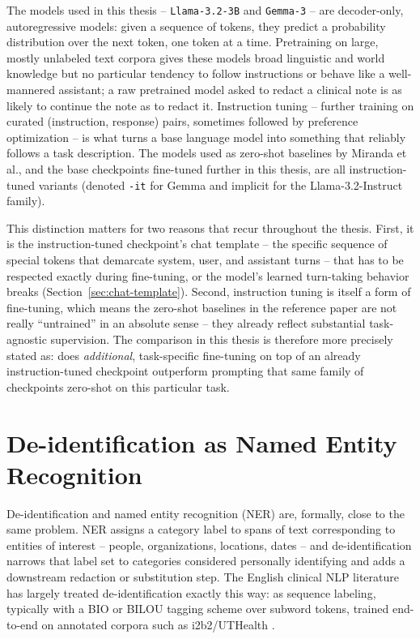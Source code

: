 \documentclass[12pt,a4paper]{report}
\begin{document}
The models used in this thesis -- \texttt{Llama-3.2-3B} and \texttt{Gemma-3} -- are decoder-only, autoregressive models: given a sequence of tokens, they predict a probability distribution over the next token, one token at a time. Pretraining on large, mostly unlabeled text corpora gives these models broad linguistic and world knowledge but no particular tendency to follow instructions or behave like a well-mannered assistant; a raw pretrained model asked to redact a clinical note is as likely to continue the note as to redact it. Instruction tuning -- further training on curated (instruction, response) pairs, sometimes followed by preference optimization -- is what turns a base language model into something that reliably follows a task description. The models used as zero-shot baselines by Miranda et al., and the base checkpoints fine-tuned further in this thesis, are all instruction-tuned variants (denoted \texttt{-it} for Gemma and implicit for the Llama-3.2-Instruct family).

This distinction matters for two reasons that recur throughout the thesis. First, it is the instruction-tuned checkpoint's chat template -- the specific sequence of special tokens that demarcate system, user, and assistant turns -- that has to be respected exactly during fine-tuning, or the model's learned turn-taking behavior breaks (Section~\ref{sec:chat-template}). Second, instruction tuning is itself a form of fine-tuning, which means the zero-shot baselines in the reference paper are not really ``untrained'' in an absolute sense -- they already reflect substantial task-agnostic supervision. The comparison in this thesis is therefore more precisely stated as: does \emph{additional}, task-specific fine-tuning on top of an already instruction-tuned checkpoint outperform prompting that same family of checkpoints zero-shot on this particular task.

\section{De-identification as Named Entity Recognition}

De-identification and named entity recognition (NER) are, formally, close to the same problem. NER assigns a category label to spans of text corresponding to entities of interest -- people, organizations, locations, dates -- and de-identification narrows that label set to categories considered personally identifying and adds a downstream redaction or substitution step. The English clinical NLP literature has largely treated de-identification exactly this way: as sequence labeling, typically with a BIO or BILOU tagging scheme over subword tokens, trained end-to-end on annotated corpora such as i2b2/UTHealth \citep{stubbs2015automated,dernoncourt2017deidentification}.
\end{document}

